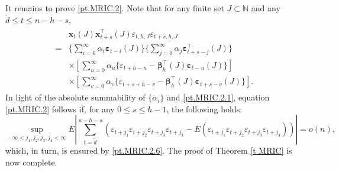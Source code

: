 \documentclass[ejsv2]{imsart}
\theoremstyle{plain}
\theoremstyle{definition}
\theoremstyle{remark}
\begin{document}
{It remains to prove \eqref{pt.MRIC.2}. Note that for any finite set $J\subset\mathbb{N}$ and any $\tilde{d}\leq t \leq n-h-s$,
\begin{align}\label{pt.MRIC.2.1}
\begin{split}
    &\mathbf{x}_{t}(J)\mathbf{x}_{t+s}^\top(J)\varepsilon_{t,h,J}\varepsilon_{t+s,h,J}\\
    = & \big\{\sum_{i=0}^{\infty}\alpha_i\bm{\varepsilon}_{t-i}(J)\big\}
    \big\{\sum_{j=0}^{\infty}\alpha_j\bm{\varepsilon}_{t+s-j}^\top(J)\big\}\\
    &\times
    \left[\sum_{u=0}^{\infty}\alpha_u\{\varepsilon_{t+h-u}-\bm{\beta}_h^\top(J)\bm{\varepsilon}_{t-u}(J)\}\right]\\
    &\times
    \left[\sum_{v=0}^{\infty}\alpha_v\{\varepsilon_{t+s+h-v}-\bm{\beta}_h^\top(J)\bm{\varepsilon}_{t+s-v}(J)\}\right].
    \end{split}
\end{align}
In light of the absolute summability of $\{\alpha_i\}$ and %
\eqref{pt.MRIC.2.1}, equation \eqref{pt.MRIC.2} follows if, for any $0\leq s\leq h-1$, the following holds:
\begin{equation*}
\sup\limits_{-\infty< j_1,j_2,j_3,j_4<\infty}E|\sum_{t=\tilde{d}}^{n-h-s}(\varepsilon_{t+j_1}\varepsilon_{t+j_2}\varepsilon_{t+j_3}\varepsilon_{t+j_4}-E(\varepsilon_{t+j_1}\varepsilon_{t+j_2}\varepsilon_{t+j_3}\varepsilon_{t+j_4}))|=o(n),
\end{equation*}
which, in turn, is ensured by \eqref{pt.MRIC.2.6}. The proof of Theorem \ref{t MRIC} is now complete.}
\end{document}
